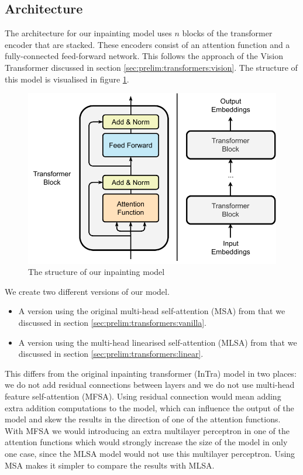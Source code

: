 \subsection{Architecture}

The architecture for our inpainting model uses $n$ blocks of the transformer encoder that are stacked.
These encoders consist of an attention function and a fully-connected feed-forward network. This follows the approach of the Vision Transformer discussed in section \ref{sec:prelim:transformers:vision}. The structure of this model is visualised in figure \ref{fig:experimental-setup:model-structure}.

\begin{figure}[ht!]
\centering
\includegraphics[width=\textwidth]{imgs/model-structure.pdf}
\caption{The structure of our inpainting model}
\label{fig:experimental-setup:model-structure}
\end{figure}

We create two different versions of our model.

\begin{itemize}
    \item A version using the original multi-head self-attention (MSA) from \cite{vaswani_attention_2017} that we discussed in section \ref{sec:prelim:transformers:vanilla}.
    \item A version using the multi-head linearised self-attention (MLSA) from \cite{katharopoulos_transformers_2020} that we discussed in section \ref{sec:prelim:transformers:linear}.
\end{itemize}

This differs from the original inpainting transformer (InTra) model in two places: we do not add residual connections between layers and we do not use multi-head feature self-attention (MFSA). Using residual connection would mean adding extra addition computations to the model, which can influence the output of the model and skew the results in the direction of one of the attention functions. With MFSA we would introducing an extra multilayer perceptron in one of the attention functions which would strongly increase the size of the model in only one case, since the MLSA model would not use this multilayer perceptron. Using MSA makes it simpler to compare the results with MLSA.

